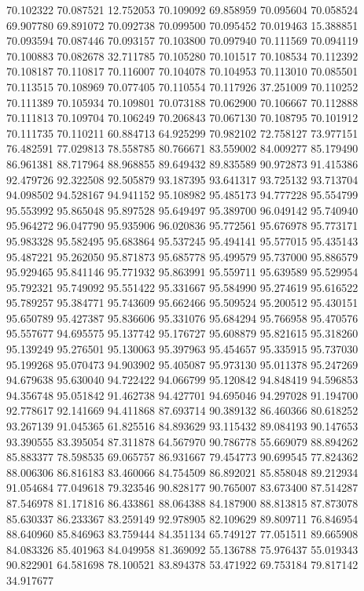 70.102322
70.087521
12.752053
70.109092
69.858959
70.095604
70.058524
69.907780
69.891072
70.092738
70.099500
70.095452
70.019463
15.388851
70.093594
70.087446
70.093157
70.103800
70.097940
70.111569
70.094119
70.100883
70.082678
32.711785
70.105280
70.101517
70.108534
70.112392
70.108187
70.110817
70.116007
70.104078
70.104953
70.113010
70.085501
70.113515
70.108969
70.077405
70.110554
70.117926
37.251009
70.110252
70.111389
70.105934
70.109801
70.073188
70.062900
70.106667
70.112888
70.111813
70.109704
70.106249
70.206843
70.067130
70.108795
70.101912
70.111735
70.110211
60.884713
64.925299
70.982102
72.758127
73.977151
76.482591
77.029813
78.558785
80.766671
83.559002
84.009277
85.179490
86.961381
88.717964
88.968855
89.649432
89.835589
90.972873
91.415386
92.479726
92.322508
92.505879
93.187395
93.641317
93.725132
93.713704
94.098502
94.528167
94.941152
95.108982
95.485173
94.777228
95.554799
95.553992
95.865048
95.897528
95.649497
95.389700
96.049142
95.740940
95.964272
96.047790
95.935906
96.020836
95.772561
95.676978
95.773171
95.983328
95.582495
95.683864
95.537245
95.494141
95.577015
95.435143
95.487221
95.262050
95.871873
95.685778
95.499579
95.737000
95.886579
95.929465
95.841146
95.771932
95.863991
95.559711
95.639589
95.529954
95.792321
95.749092
95.551422
95.331667
95.584990
95.274619
95.616522
95.789257
95.384771
95.743609
95.662466
95.509524
95.200512
95.430151
95.650789
95.427387
95.836606
95.331076
95.684294
95.766958
95.470576
95.557677
94.695575
95.137742
95.176727
95.608879
95.821615
95.318260
95.139249
95.276501
95.130063
95.397963
95.454657
95.335915
95.737030
95.199268
95.070473
94.903902
95.405087
95.973130
95.011378
95.247269
94.679638
95.630040
94.722422
94.066799
95.120842
94.848419
94.596853
94.356748
95.051842
91.462738
94.427701
94.695046
94.297028
91.194700
92.778617
92.141669
94.411868
87.693714
90.389132
86.460366
80.618252
93.267139
91.045365
61.825516
84.893629
93.115432
89.084193
90.147653
93.390555
83.395054
87.311878
64.567970
90.786778
55.669079
88.894262
85.883377
78.598535
69.065757
86.931667
79.454773
90.699545
77.824362
88.006306
86.816183
83.460066
84.754509
86.892021
85.858048
89.212934
91.054684
77.049618
79.323546
90.828177
90.765007
83.673400
87.514287
87.546978
81.171816
86.433861
88.064388
84.187900
88.813815
87.873078
85.630337
86.233367
83.259149
92.978905
82.109629
89.809711
76.846954
88.640960
85.846963
83.759444
84.351134
65.749127
77.051511
89.665908
84.083326
85.401963
84.049958
81.369092
55.136788
75.976437
55.019343
90.822901
64.581698
78.100521
83.894378
53.471922
69.753184
79.817142
34.917677
